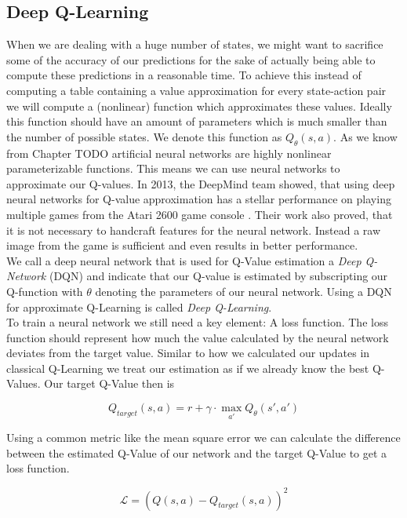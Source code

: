 \subsection{Deep Q-Learning} \label{ssec:DeepQLearning}
When we are dealing with a huge number of states, we might want to sacrifice some of the accuracy of our predictions for the sake of actually being able to compute these predictions in a reasonable time. To achieve this instead of computing a table containing a value approximation for every state-action pair we will compute a (nonlinear) function which approximates these values. Ideally this function should have an amount of parameters which is much smaller than the number of possible states. We denote this function as $Q_\theta(s, a)$. As we know from Chapter TODO artificial neural networks are highly nonlinear parameterizable functions. This means we can use neural networks to approximate our Q-values. In 2013, the DeepMind team showed, that using deep neural networks for Q-value approximation has a stellar performance on playing multiple games from the Atari 2600 game console \cite{mnih2013playing}. Their work also proved, that it is not necessary to handcraft features for the neural network. Instead a raw image from the game is sufficient and even results in better performance. \\
We call a deep neural network that is used for Q-Value estimation a \textit{Deep Q-Network} (DQN) and indicate that our Q-value is estimated by subscripting our Q-function with $\theta$ denoting the parameters of our neural network. Using a DQN for approximate Q-Learning is called \textit{Deep Q-Learning}. \\
To train a neural network we still need a key element: A loss function. The loss function should represent how much the value calculated by the neural network deviates from the target value. Similar to how we calculated our updates in classical Q-Learning we treat our estimation as if we already know the best Q-Values. Our target Q-Value then is 

\[Q_{target}(s, a) = r + \gamma \cdot \max_{a'}Q_\theta(s', a')\]

Using a common metric like the mean square error we can calculate the difference between the estimated Q-Value of our network and the target Q-Value to get a loss function.

\[\mathcal{L} = (Q(s, a) - Q_{target}(s, a))^2\]

